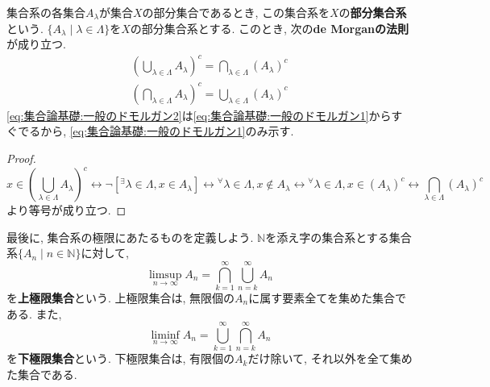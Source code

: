 \documentclass[a4j,dvipdfmx]{jsarticle}
\numberwithin{equation}{section}
\begin{document}
            集合系の各集合$A_\lambda$が集合$X$の部分集合であるとき, この集合系を$X$の\textbf{部分集合系}という. $\{A_\lambda\mid \lambda\in\Lambda\}$を$X$の部分集合系とする.
            このとき, 次の\textbf{de Morganの法則}が成り立つ.
            \begin{align}
                \left(\bigcup_{\lambda\in\Lambda}A_\lambda\right)^c=\bigcap_{\lambda\in\Lambda}(A_\lambda)^c \label{eq:集合論基礎:一般のドモルガン1}\\
                \left(\bigcap_{\lambda\in\Lambda}A_\lambda\right)^c=\bigcup_{\lambda\in\Lambda}(A_\lambda)^c \label{eq:集合論基礎:一般のドモルガン2}
            \end{align}
            \eqref{eq:集合論基礎:一般のドモルガン2}は\eqref{eq:集合論基礎:一般のドモルガン1}からすぐでるから, \eqref{eq:集合論基礎:一般のドモルガン1}のみ示す.
            \begin{proof}
                \begin{equation*}
                    x\in \left(\bigcup_{\lambda\in\Lambda}A_\lambda\right)^c \leftrightarrow \lnot [{}^\exists\lambda\in\Lambda,x\in A_\lambda]\leftrightarrow{}^\forall\lambda\in\Lambda,x\not\in A_\lambda\leftrightarrow{}^\forall\lambda\in\Lambda,x\in (A_\lambda)^c\leftrightarrow \bigcap_{\lambda\in\Lambda}(A_\lambda)^c
                \end{equation*}
                より等号が成り立つ.
            \end{proof}
            最後に, 集合系の極限にあたるものを定義しよう. $\mathbb{N}$を添え字の集合系とする集合系$\{A_n\mid n\in\mathbb{N}\}$に対して, 
            \begin{equation}
                \limsup_{n\to\infty}A_n=\bigcap_{k=1}^{\infty}\bigcup_{n=k}^\infty A_n \label{eq:集合論基礎:集合のlimsup}
            \end{equation}
            を\textbf{上極限集合}という. 上極限集合は, 無限個の$A_n$に属す要素全てを集めた集合である. また, 
            \begin{equation}
                \liminf_{n\to\infty}A_n=\bigcup_{k=1}^{\infty}\bigcap_{n=k}^\infty A_n \label{eq:集合論基礎:集合のliminf}
            \end{equation}
            を\textbf{下極限集合}という. 下極限集合は, 有限個の$A_k$だけ除いて, それ以外を全て集めた集合である. 
\end{document}
